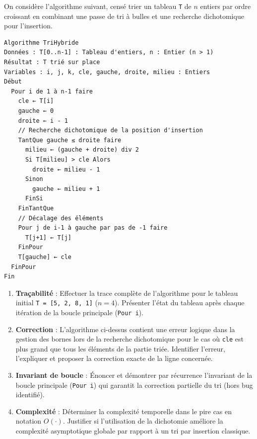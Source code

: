 \documentclass[11pt]{article}
\begin{document}
\begin{exercice}
On considère l'algorithme suivant, censé trier un tableau \texttt{T} de $n$ entiers par ordre croissant en combinant une passe de tri à bulles et une recherche dichotomique pour l'insertion.

\begin{verbatim}
Algorithme TriHybride
Données : T[0..n-1] : Tableau d'entiers, n : Entier (n > 1)
Résultat : T trié sur place
Variables : i, j, k, cle, gauche, droite, milieu : Entiers
Début
  Pour i de 1 à n-1 faire
    cle ← T[i]
    gauche ← 0
    droite ← i - 1
    // Recherche dichotomique de la position d'insertion
    TantQue gauche ≤ droite faire
      milieu ← (gauche + droite) div 2
      Si T[milieu] > cle Alors
        droite ← milieu - 1
      Sinon
        gauche ← milieu + 1
      FinSi
    FinTantQue
    // Décalage des éléments
    Pour j de i-1 à gauche par pas de -1 faire
      T[j+1] ← T[j]
    FinPour
    T[gauche] ← cle
  FinPour
Fin
\end{verbatim}

\begin{enumerate}
\item \textbf{Traçabilité} : Effectuer la trace complète de l'algorithme pour le tableau initial \texttt{T = [5, 2, 8, 1]} ($n=4$). Présenter l'état du tableau après chaque itération de la boucle principale (\texttt{Pour i}).
\item \textbf{Correction} : L'algorithme ci-dessus contient une erreur logique dans la gestion des bornes lors de la recherche dichotomique pour le cas où \texttt{cle} est plus grand que tous les éléments de la partie triée. Identifier l'erreur, l'expliquer et proposer la correction exacte de la ligne concernée.
\item \textbf{Invariant de boucle} : Énoncer et démontrer par récurrence l'invariant de la boucle principale (\texttt{Pour i}) qui garantit la correction partielle du tri (hors bug identifié).
\item \textbf{Complexité} : Déterminer la complexité temporelle dans le pire cas en notation $O(\cdot)$. Justifier si l'utilisation de la dichotomie améliore la complexité asymptotique globale par rapport à un tri par insertion classique.
\end{enumerate}
\end{exercice}
\end{document}
